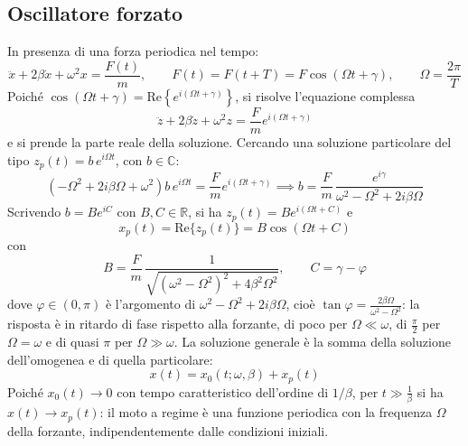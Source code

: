 \documentclass[11pt, a4paper, openright]{book}
\theoremstyle{plain}
\theoremstyle{definition}
\theoremstyle{remark}
\begin{document}
\subsection{Oscillatore forzato}
In presenza di una forza periodica nel tempo:
\begin{equation}
    \ddot{x} + 2\beta\dot{x} + \omega^2 x = \frac{F(t)}{m}, \qquad F(t) = F(t + T) = F\cos(\Omega t + \gamma), \qquad \Omega = \frac{2\pi}{T}
\end{equation}
Poiché $\cos(\Omega t + \gamma) = \mathrm{Re}\left\{e^{i(\Omega t + \gamma)}\right\}$, si risolve l'equazione complessa
\begin{equation}
    \ddot{z} + 2\beta\dot{z} + \omega^2 z = \frac{F}{m}e^{i(\Omega t + \gamma)}
\end{equation}
e si prende la parte reale della soluzione. Cercando una soluzione particolare del tipo $z_p(t) = b\,e^{i\Omega t}$, con $b \in \mathbb{C}$:
\begin{equation}
    \left(-\Omega^2 + 2i\beta\Omega + \omega^2\right)b\,e^{i\Omega t} = \frac{F}{m}e^{i(\Omega t + \gamma)} \implies b = \frac{F}{m}\,\frac{e^{i\gamma}}{\omega^2 - \Omega^2 + 2i\beta\Omega}
\end{equation}
Scrivendo $b = Be^{iC}$ con $B, C \in \mathbb{R}$, si ha $z_p(t) = Be^{i(\Omega t + C)}$ e
\begin{equation}
    x_p(t) = \mathrm{Re}\{z_p(t)\} = B\cos(\Omega t + C)
\end{equation}
con
\begin{equation}
    B = \frac{F}{m}\,\frac{1}{\sqrt{(\omega^2 - \Omega^2)^2 + 4\beta^2\Omega^2}}, \qquad C = \gamma - \varphi
\end{equation}
dove $\varphi \in (0, \pi)$ è l'argomento di $\omega^2 - \Omega^2 + 2i\beta\Omega$, cioè $\tan\varphi = \frac{2\beta\Omega}{\omega^2 - \Omega^2}$: la risposta è in ritardo di fase rispetto alla forzante, di poco per $\Omega \ll \omega$, di $\frac{\pi}{2}$ per $\Omega = \omega$ e di quasi $\pi$ per $\Omega \gg \omega$.
La soluzione generale è la somma della soluzione dell'omogenea e di quella particolare:
\begin{equation}
    x(t) = x_0(t; \omega, \beta) + x_p(t)
\end{equation}
Poiché $x_0(t) \to 0$ con tempo caratteristico dell'ordine di $1/\beta$, per $t \gg \frac{1}{\beta}$ si ha $x(t) \to x_p(t)$: il moto a regime è una funzione periodica con la frequenza $\Omega$ della forzante, indipendentemente dalle condizioni iniziali.
\end{document}
